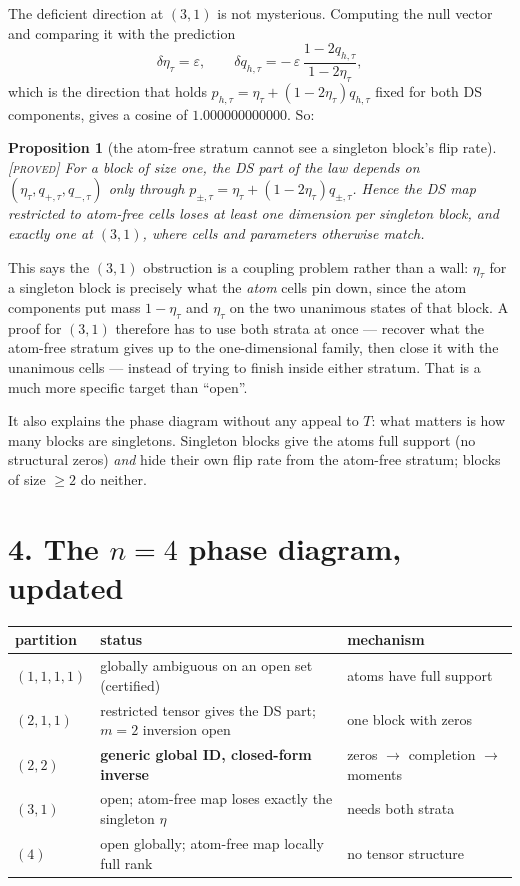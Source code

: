 \documentclass[11pt]{article}
\newtheorem{proposition}{Proposition}
\theoremstyle{remark}
\newcommand{\status}[1]{\hfill{\normalfont\small\textsc{[#1]}}}
\begin{document}
The deficient direction at $(3,1)$ is not mysterious. Computing the null vector and comparing it with the prediction
\[
\delta\eta_\tau=\varepsilon,\qquad \delta q_{h,\tau}=-\,\varepsilon\,\frac{1-2q_{h,\tau}}{1-2\eta_\tau},
\]
which is the direction that holds $p_{h,\tau}=\eta_\tau+(1-2\eta_\tau)q_{h,\tau}$ fixed for both DS components, gives a cosine of $1.000000000000$. So:

\begin{proposition}[the atom-free stratum cannot see a singleton block's flip rate]\status{proved}
For a block of size one, the DS part of the law depends on $(\eta_\tau,q_{+,\tau},q_{-,\tau})$ only through $p_{\pm,\tau}=\eta_\tau+(1-2\eta_\tau)q_{\pm,\tau}$. Hence the DS map restricted to atom-free cells loses at least one dimension per singleton block, and exactly one at $(3,1)$, where cells and parameters otherwise match.
\end{proposition}

This says the $(3,1)$ obstruction is a coupling problem rather than a wall: $\eta_\tau$ for a singleton block is precisely what the \emph{atom} cells pin down, since the atom components put mass $1-\eta_\tau$ and $\eta_\tau$ on the two unanimous states of that block. A proof for $(3,1)$ therefore has to use both strata at once --- recover what the atom-free stratum gives up to the one-dimensional family, then close it with the unanimous cells --- instead of trying to finish inside either stratum. That is a much more specific target than ``open''.

It also explains the phase diagram without any appeal to $T$: what matters is how many blocks are singletons. Singleton blocks give the atoms full support (no structural zeros) \emph{and} hide their own flip rate from the atom-free stratum; blocks of size $\ge2$ do neither.

\section*{4. The $n=4$ phase diagram, updated}

\begin{center}\small
\begin{tabular}{@{}lll@{}}
\toprule
partition & status & mechanism\\
\midrule
$(1,1,1,1)$ & globally ambiguous on an open set (certified) & atoms have full support\\
$(2,1,1)$ & restricted tensor gives the DS part; $m=2$ inversion open & one block with zeros\\
$(2,2)$ & \textbf{generic global ID, closed-form inverse} & zeros $\to$ completion $\to$ moments\\
$(3,1)$ & open; atom-free map loses exactly the singleton $\eta$ & needs both strata\\
$(4)$ & open globally; atom-free map locally full rank & no tensor structure\\
\bottomrule
\end{tabular}
\end{center}
\end{document}
